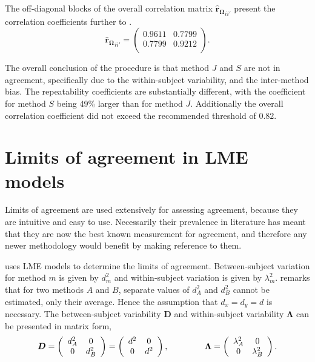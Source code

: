 \documentclass[12pt, a4paper]{article}
\theoremstyle{plain}
\theoremstyle{definition}
\theoremstyle{remark}
\begin{document}
The off-diagonal blocks of the overall correlation matrix $\boldsymbol{\hat{r}_{\Omega}}_{ii'}$ present the correlation coefficients further to \citet{hamlett}.
\[
\boldsymbol{\hat{r}_{\Omega}}_{ii'} = \left( \begin{array}{cc}
    0.9611  & 0.7799  \\
    0.7799  & 0.9212  \\
    \end{array}\right).
\]

The overall conclusion of the procedure is that method $J$ and $S$ are not in agreement, specifically due to the within-subject variability, and the inter-method bias. The repeatability coefficients are substantially different, with the coefficient for method $S$ being 49\% larger than for method $J$. Additionally the overall correlation coefficient did not exceed the recommended threshold of $0.82$.


\newpage
\section{Limits of agreement in LME models}

Limits of agreement are used extensively for assessing agreement, because they are intuitive and easy to use.
Necessarily their prevalence in literature has meant that they are now the best known measurement for agreement, and therefore any newer methodology would benefit by making reference to them.

\citet{BXC2008} uses LME models to determine the limits of agreement. Between-subject variation for method $m$ is given by $d^2_{m}$ and within-subject variation is given by $\lambda^2_{m}$.  \citet{BXC2008} remarks that for two methods $A$ and $B$, separate values of $d^2_{A}$ and $d^2_{B}$ cannot be estimated, only their average. Hence the assumption that $d_{x}= d_{y}= d$ is necessary. The between-subject variability $\boldsymbol{D}$ and within-subject variability $\boldsymbol{\Lambda}$ can be presented in matrix form,\[
\boldsymbol{D} = \left(%
\begin{array}{cc}
   d^2_{A}& 0 \\
  0 & d^2_{B} \\
\end{array}%
\right)=\left(%
\begin{array}{cc}
   d^2& 0 \\
  0 & d^2\\
\end{array}%
\right),
\hspace{1.5cm}
\boldsymbol{\Lambda} = \left(%
\begin{array}{cc}
   \lambda^2_{A}& 0 \\
  0 & \lambda^2_{B} \\
\end{array}%
\right).
\]
\end{document}
